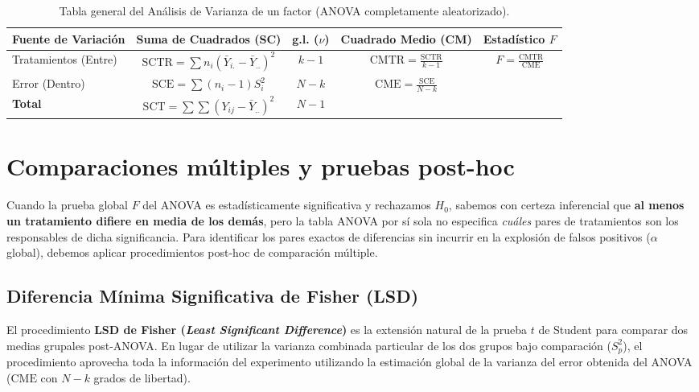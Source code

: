 \begin{table}[h!]
	\centering
	\begin{tabular}{lcccc}
		\hline
		\textbf{Fuente de Variación} & \textbf{Suma de Cuadrados (SC)} & \textbf{g.l. ($\nu$)} & \textbf{Cuadrado Medio (CM)} & \textbf{Estadístico $F$} \\ \hline
		Tratamientos (Entre) & $\text{SCTR} = \sum n_i (\bar{Y}_{i.} - \bar{Y}_{..})^2$ & $k - 1$ & $\text{CMTR} = \frac{\text{SCTR}}{k - 1}$ & $F = \frac{\text{CMTR}}{\text{CME}}$ \\ [1.5ex]
		Error (Dentro) & $\text{SCE} = \sum (n_i - 1) S_i^2$ & $N - k$ & $\text{CME} = \frac{\text{SCE}}{N - k}$ & \\ [1.5ex] \hline
		\textbf{Total} & $\text{SCT} = \sum \sum (Y_{ij} - \bar{Y}_{..})^2$ & $N - 1$ & & \\ \hline
	\end{tabular}
	\caption{Tabla general del Análisis de Varianza de un factor (ANOVA completamente aleatorizado).}
	\label{tab:anova_un_factor}
\end{table}

\section*{Comparaciones múltiples y pruebas post-hoc}

Cuando la prueba global $F$ del ANOVA es estadísticamente significativa y rechazamos $H_0$, sabemos con certeza inferencial que \textbf{al menos un tratamiento difiere en media de los demás}, pero la tabla ANOVA por sí sola no especifica \emph{cuáles} pares de tratamientos son los responsables de dicha significancia. Para identificar los pares exactos de diferencias sin incurrir en la explosión de falsos positivos ($\alpha$ global), debemos aplicar procedimientos post-hoc de comparación múltiple.

\subsection*{Diferencia Mínima Significativa de Fisher (LSD)}

El procedimiento \textbf{LSD de Fisher (\emph{Least Significant Difference})} es la extensión natural de la prueba $t$ de Student para comparar dos medias grupales post-ANOVA. En lugar de utilizar la varianza combinada particular de los dos grupos bajo comparación ($S_p^2$), el procedimiento aprovecha toda la información del experimento utilizando la estimación global de la varianza del error obtenida del ANOVA ($\text{CME}$ con $N-k$ grados de libertad).

